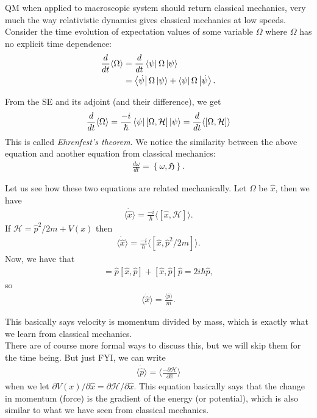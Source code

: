 \documentclass{book}
\theoremstyle{definition}
\newcommand{\p}{\partial}
\newcommand{\ham}{\mathcal{H}}
\newcommand{\f}[2]{\frac{#1}{#2}}
\newcommand{\lc}{\left\{}
\newcommand{\rc}{\right\}}
\begin{document}
QM when applied to macroscopic system should return classical mechanics, very much the way relativistic dynamics gives classical mechanics at low speeds. Consider the time evolution of expectation values of some variable $\Omega$ where $\Omega$ has no explicit time dependence:
\begin{align}
\f{d}{dt}\langle \Omega \rangle &= \f{d}{dt}\bra{\psi}\Omega\ket{\psi} \\
&= \bra{\dot{\psi}} \Omega \ket{\psi} + \bra{\psi}\Omega\ket{\dot{\psi}}.
\end{align}

From the SE and its adjoint (and their difference), we get
\begin{align}
{\f{d}{dt}\langle \Omega\rangle = \f{-i}{\hbar}\bra{\psi}[\Omega,\ham]\ket{\psi} = \f{d}{dt}\langle [\Omega,\ham]\rangle}
\end{align}
This is called \textit{Ehrenfest's theorem}. We notice the similarity between the above equation and another equation from classical mechanics:
\begin{align}
\f{d\omega}{dt} = \lc \omega,\mathfrak{H} \rc.
\end{align}


Let us see how these two equations are related mechanically. Let $\Omega$ be $\hat{x}$, then we have
\begin{align}
\langle \dot{\hat{x}} \rangle = \f{-i}{\hbar}\langle [\hat{x},\ham]\rangle.
\end{align}
If $\ham = \hat{p}^2/2m + V(x)$ then 
\begin{align}
\langle\dot{\hat{x}}\rangle = \f{-i}{\hbar} \langle [\hat{x}, \hat{p}^2/2m] \rangle.
\end{align}
Now, we have that
\begin{align}
[\hat{x},\hat{p}] = \hat{p}[\hat{x},\hat{p}] + [\hat{x},\hat{p}]\hat{p} = 2i\hbar \hat{p},
\end{align}
so
\begin{align}
\langle \dot{\hat{x}} \rangle = \f{\langle\hat{p}\rangle}{m}.
\end{align}

This basically says velocity is momentum divided by mass, which is exactly what we learn from classical mechanics. \\

There are of course more formal ways to discuss this, but we will skip them for the time being. But just FYI, we can write
\begin{align}
\langle \dot{\hat{p}} \rangle = \bigg\langle \f{-\p\ham}{\p \hat{x}}\bigg\rangle
\end{align}
when we let $\p V(x)/\p \hat{x} = \p \ham / \p \hat{x}$. This equation basically says that the change in momentum (force) is the gradient of the energy (or potential), which is also similar to what we have seen from classical mechanics. 
\end{document}
